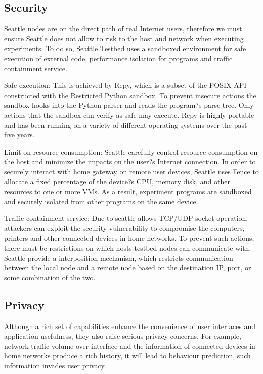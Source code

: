 \documentclass[11pt, oneside]{article}   	%
\begin{document}
\subsection{Security}
Seattle nodes are on the direct path of real Internet users, therefore we must ensure Seattle does not allow to risk to the host and network when executing experiments. To do so, Seattle Testbed uses a sandboxed environment for safe execution of external code, performance isolation for programs and traffic containment service. 

Safe execution: This is achieved by Repy, which is a subset of the POSIX API constructed with the Restricted Python sandbox. To prevent insecure actions the sandbox hooks into the Python parser and reads the program?s parse tree. Only actions that the sandbox can verify as safe may execute. Repy is highly portable and has been running on a variety of different operating systems over the past five years.

Limit on resource consumption: Seattle carefully control resource consumption on the host and minimize the impacts on the user?s Internet connection. In order to securely interact with home gateway on remote user devices, Seattle uses Fence to allocate a fixed percentage of the device?s CPU, memory disk, and other resources to one or more VMs. As a result, experiment programs are sandboxed and securely isolated from other programs on the same device. 

Traffic containment service: Due to seattle allows TCP/UDP socket operation, attackers can exploit the security vulnerability to compromise the computers, printers and other connected devices in home networks. To prevent such actions, there must be restrictions on which hosts testbed nodes can communicate with. Seattle provide a interposition mechanism, which restricts communication between the local node and a remote node based on the destination IP, port, or some combination of the two. 

\subsection{Privacy}
Although a rich set of capabilities enhance the convenience of user interfaces and application usefulness, they also raise serious privacy concerns. For example, network traffic volume over interface and the information of connected devices in home networks produce a rich history, it will lead to behaviour prediction, such information invades user privacy. 
\end{document}
